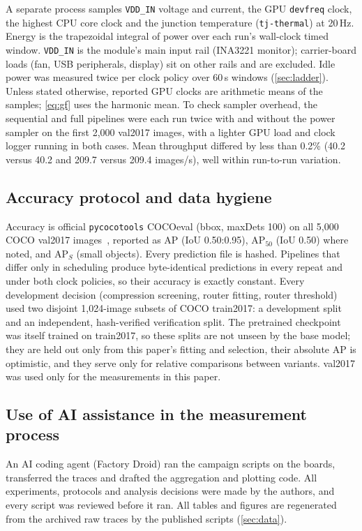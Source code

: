 A separate process samples \texttt{VDD\_IN} voltage and current, the GPU
\texttt{devfreq} clock, the highest CPU core clock and the junction
temperature (\texttt{tj-thermal}) at 20\,Hz. Energy is the trapezoidal
integral of power over each run's wall-clock timed window.
\texttt{VDD\_IN} is the module's main input rail (INA3221 monitor);
carrier-board loads (fan, USB peripherals, display) sit on other rails
and are excluded. Idle power was measured twice per clock policy over
60\,s windows (\cref{sec:ladder}). Unless stated otherwise, reported GPU
clocks are arithmetic means of the samples; \cref{eq:gf} uses the
harmonic mean. To check sampler overhead, the sequential and full
pipelines were each run twice with and without the power sampler on the
first 2,000 val2017 images, with a lighter GPU load and clock logger
running in both cases. Mean throughput differed by less than 0.2\%
(40.2 versus 40.2 and 209.7 versus 209.4 images/s), well within
run-to-run variation.

\subsection{Accuracy protocol and data hygiene}

Accuracy is official \texttt{pycocotools} COCOeval (bbox, maxDets 100)
on all 5,000 COCO val2017 images~\cite{lin2014coco}, reported as AP
(IoU 0.50:0.95), AP$_{50}$ (IoU 0.50) where noted, and AP$_S$ (small
objects). Every prediction file is hashed. Pipelines that differ only
in scheduling produce byte-identical predictions in every repeat and
under both clock policies, so their accuracy is exactly constant. Every
development decision (compression screening, router fitting, router
threshold) used two disjoint 1,024-image subsets of COCO train2017: a
development split and an independent, hash-verified verification
split. The pretrained checkpoint was itself trained on train2017, so
these splits are not unseen by the base model; they are held out only
from this paper's fitting and selection, their absolute AP is
optimistic, and they serve only for relative comparisons between
variants. val2017 was used only for the measurements in this paper.

\subsection{Use of AI assistance in the measurement process}
\label{sec:aiassist}

An AI coding agent (Factory Droid) ran the campaign scripts on the
boards, transferred the traces and drafted the aggregation and
plotting code. All experiments, protocols and analysis decisions were
made by the authors, and every script was reviewed before it ran. All
tables and figures are regenerated from the archived raw traces by the
published scripts (\cref{sec:data}).

